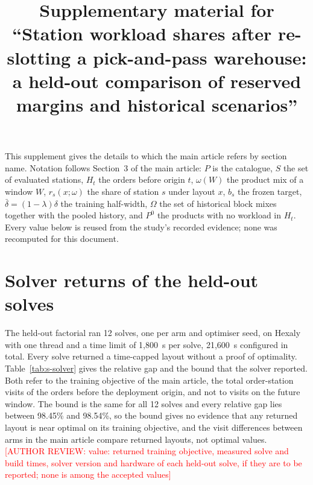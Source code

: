 \documentclass[11pt]{article}
\title{Supplementary material for ``Station workload shares after re-slotting a pick-and-pass warehouse: a held-out comparison of reserved margins and historical scenarios''}
\author{\authorreview{author list and affiliations}}
\date{}
\newcommand{\authorreview}[1]{\textcolor{red}{[AUTHOR REVIEW: #1]}}
\begin{document}
\maketitle

This supplement gives the details to which the main article refers by section name. Notation follows Section~3 of the main article: $P$ is the catalogue, $S$ the set of evaluated stations, $H_t$ the orders before origin $t$, $\omega(W)$ the product mix of a window $W$, $r_s(x;\omega)$ the share of station $s$ under layout $x$, $b_s$ the frozen target, $\bar\delta=(1-\lambda)\delta$ the training half-width, $\Omega$ the set of historical block mixes together with the pooled history, and $P^0$ the products with no workload in $H_t$. Every value below is reused from the study's recorded evidence; none was recomputed for this document.

\section{Solver returns of the held-out solves}\label{sec:s-solver}
The held-out factorial ran 12 solves, one per arm and optimiser seed, on Hexaly with one thread and a time limit of 1,800~s per solve, 21,600~s configured in total. Every solve returned a time-capped layout without a proof of optimality. Table~\ref{tab:s-solver} gives the relative gap and the bound that the solver reported. Both refer to the training objective of the main article, the total order-station visits of the orders before the deployment origin, and not to visits on the future window. The bound is the same for all 12 solves and every relative gap lies between 98.45\% and 98.54\%, so the bound gives no evidence that any returned layout is near optimal on its training objective, and the visit differences between arms in the main article compare returned layouts, not optimal values. \authorreview{value: returned training objective, measured solve and build times, solver version and hardware of each held-out solve, if they are to be reported; none is among the accepted values}
\end{document}
